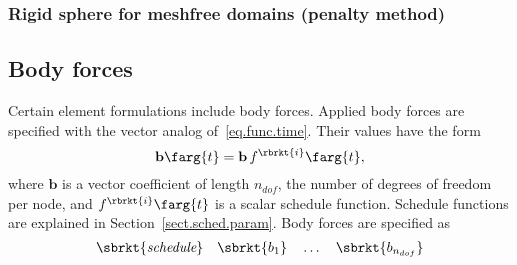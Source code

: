 \subsubsection{Rigid sphere for meshfree domains (penalty method)}

\subsection{Body forces}
\label{set.ICandBC.body}
Certain element formulations include body forces.
Applied body forces are specified with the vector analog 
of~\eqref{eq.func.time}.
Their values have the form
\begin{equation}
\label{eq.func.time}
    \mathbf{b}\farg{t} = \mathbf{b}\,f^{\rbrkt{i}}\farg{t},
\end{equation}
where $\mathbf{b}$ is a vector coefficient of length $n_{dof}$, the 
number of degrees of freedom per node, and $f^{\rbrkt{i}}\farg{t}$ 
is a scalar schedule function. Schedule functions are explained in 
Section~\ref{sect.sched.param}.
Body forces are specified as
\[  
\sbrkt{\textit{schedule}} \quad 
\sbrkt{b_{1}} \quad \ldots \quad
\sbrkt{b_{n_{dof}}}
\]

